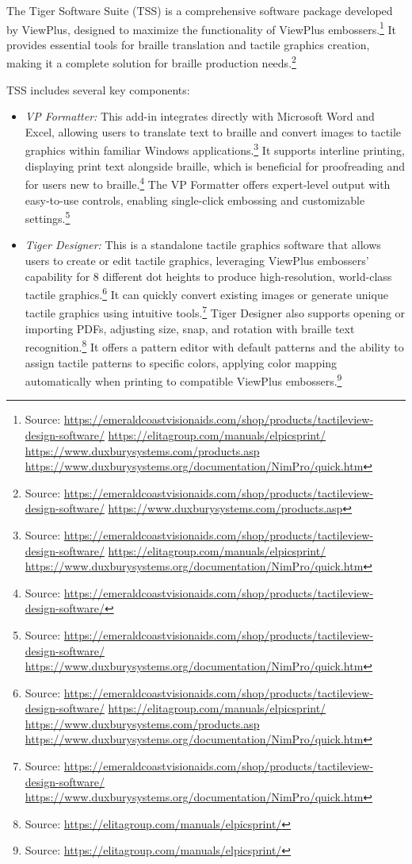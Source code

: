 The Tiger Software Suite (TSS) is a comprehensive software package developed by ViewPlus, designed to maximize the functionality of ViewPlus embossers.\footnote{Source:  \url{https://emeraldcoastvisionaids.com/shop/products/tactileview-design-software/} \url{https://elitagroup.com/manuals/elpicsprint/} \url{https://www.duxburysystems.com/products.asp} \url{https://www.duxburysystems.org/documentation/NimPro/quick.htm}} It provides essential tools for braille translation and tactile graphics creation, making it a complete solution for braille production needs.\footnote{Source:  \url{https://emeraldcoastvisionaids.com/shop/products/tactileview-design-software/} \url{https://www.duxburysystems.com/products.asp}}

TSS includes several key components:
\begin{itemize}
    \item \emph{VP Formatter:} This add-in integrates directly with Microsoft Word and Excel, allowing users to translate text to braille and convert images to tactile graphics within familiar Windows applications.\footnote{Source:  \url{https://emeraldcoastvisionaids.com/shop/products/tactileview-design-software/} \url{https://elitagroup.com/manuals/elpicsprint/} \url{https://www.duxburysystems.org/documentation/NimPro/quick.htm}} It supports interline printing, displaying print text alongside braille, which is beneficial for proofreading and for users new to braille.\footnote{Source:  \url{https://emeraldcoastvisionaids.com/shop/products/tactileview-design-software/}} The VP Formatter offers expert-level output with easy-to-use controls, enabling single-click embossing and customizable settings.\footnote{Source:  \url{https://emeraldcoastvisionaids.com/shop/products/tactileview-design-software/} \url{https://www.duxburysystems.org/documentation/NimPro/quick.htm}}
    \item \emph{Tiger Designer:} This is a standalone tactile graphics software that allows users to create or edit tactile graphics, leveraging ViewPlus embossers' capability for 8 different dot heights to produce high-resolution, world-class tactile graphics.\footnote{Source:  \url{https://emeraldcoastvisionaids.com/shop/products/tactileview-design-software/} \url{https://elitagroup.com/manuals/elpicsprint/} \url{https://www.duxburysystems.com/products.asp} \url{https://www.duxburysystems.org/documentation/NimPro/quick.htm}} It can quickly convert existing images or generate unique tactile graphics using intuitive tools.\footnote{Source:  \url{https://emeraldcoastvisionaids.com/shop/products/tactileview-design-software/} \url{https://www.duxburysystems.org/documentation/NimPro/quick.htm}} Tiger Designer also supports opening or importing PDFs, adjusting size, snap, and rotation with braille text recognition.\footnote{Source:  \url{https://elitagroup.com/manuals/elpicsprint/}} It offers a pattern editor with default patterns and the ability to assign tactile patterns to specific colors, applying color mapping automatically when printing to compatible ViewPlus embossers.\footnote{Source:  \url{https://elitagroup.com/manuals/elpicsprint/}}

\end{itemize}
